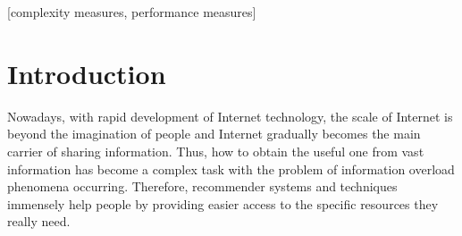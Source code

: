 \documentclass{acm_proc_article-sp}
\begin{document}

\maketitle
\begin{abstract}
Due to the expansion of academic research in diverse fields, the problem of finding relevant and potential collaborators has become cumbersome. In this work, we propose an academic collaboration recommendation model called CCRec. CCRec combines publication contents with collaboration networks to effectively generate academic collaboration recommendation for researchers. Using the DBLP data sets, we conduct benchmarking experiments to examine the performance of CCRec. Our preliminary experimental results show that CCRec outperforms other state-of-the-art methods especially in addressing the topic drift problems.
\end{abstract}

[complexity measures, performance measures]



\section{Introduction}
Nowadays, with rapid development of Internet technology, the scale of Internet is beyond the imagination of people and Internet gradually becomes the main carrier of sharing information. Thus, how to obtain the useful one from vast information has become a complex task with the problem of information overload phenomena occurring. Therefore, recommender systems and techniques immensely help people by providing easier access to the specific resources they really need.
\end{document}
